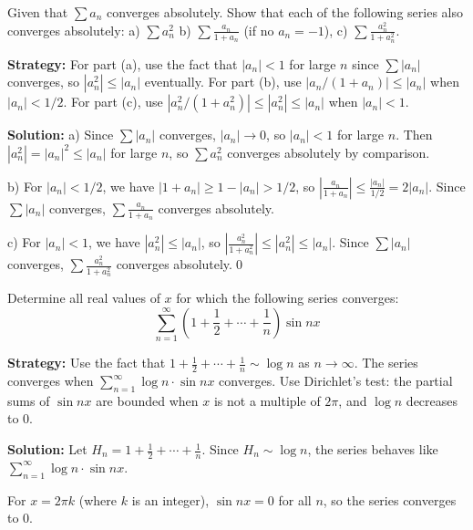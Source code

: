 \begin{problembox}
Given that \(\sum a_n\) converges absolutely. Show that each of the following series also converges absolutely:
a) \(\sum a_n^2\) b) \(\sum \frac{a_n}{1 + a_n}\) (if no \(a_n = -1\)),
c) \(\sum \frac{a_n^2}{1 + a_n^2}\).
\end{problembox}

\noindent\textbf{Strategy:} For part (a), use the fact that \(|a_n| < 1\) for large \(n\) since \(\sum |a_n|\) converges, so \(|a_n^2| \leq |a_n|\) eventually. For part (b), use \(|a_n/(1+a_n)| \leq |a_n|\) when \(|a_n| < 1/2\). For part (c), use \(|a_n^2/(1+a_n^2)| \leq |a_n^2| \leq |a_n|\) when \(|a_n| < 1\).

\bigskip\noindent\textbf{Solution:}
a) Since \(\sum |a_n|\) converges, \(|a_n| \to 0\), so \(|a_n| < 1\) for large \(n\). Then \(|a_n^2| = |a_n|^2 \leq |a_n|\) for large \(n\), so \(\sum a_n^2\) converges absolutely by comparison.

b) For \(|a_n| < 1/2\), we have \(|1 + a_n| \geq 1 - |a_n| > 1/2\), so \(\left|\frac{a_n}{1 + a_n}\right| \leq \frac{|a_n|}{1/2} = 2|a_n|\). Since \(\sum |a_n|\) converges, \(\sum \frac{a_n}{1 + a_n}\) converges absolutely.

c) For \(|a_n| < 1\), we have \(|a_n^2| \leq |a_n|\), so \(\left|\frac{a_n^2}{1 + a_n^2}\right| \leq |a_n^2| \leq |a_n|\). Since \(\sum |a_n|\) converges, \(\sum \frac{a_n^2}{1 + a_n^2}\) converges absolutely.\qed



\begin{problembox}
Determine all real values of \(x\) for which the following series converges:
\[\sum_{n=1}^{\infty} \left( 1 + \frac{1}{2} + \cdots + \frac{1}{n} \right) \sin nx\]
\end{problembox}

\noindent\textbf{Strategy:} Use the fact that \(1 + \frac{1}{2} + \cdots + \frac{1}{n} \sim \log n\) as \(n \to \infty\). The series converges when \(\sum_{n=1}^{\infty} \log n \cdot \sin nx\) converges. Use Dirichlet's test: the partial sums of \(\sin nx\) are bounded when \(x\) is not a multiple of \(2\pi\), and \(\log n\) decreases to 0.

\bigskip\noindent\textbf{Solution:}
Let \(H_n = 1 + \frac{1}{2} + \cdots + \frac{1}{n}\). Since \(H_n \sim \log n\), the series behaves like \(\sum_{n=1}^{\infty} \log n \cdot \sin nx\).

For \(x = 2\pi k\) (where \(k\) is an integer), \(\sin nx = 0\) for all \(n\), so the series converges to 0.

